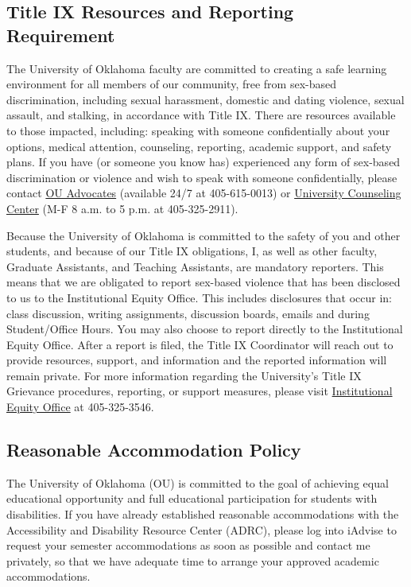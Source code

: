 \documentclass[11pt,english]{article}
\begin{document}
\subsection*{Title IX Resources and Reporting Requirement}

The University of Oklahoma faculty are committed to creating a safe learning environment for all members of our community, free from sex-based discrimination, including sexual harassment, domestic and dating violence, sexual assault, and stalking, in accordance with Title IX. There are resources available to those impacted, including: speaking with someone confidentially about your options, medical attention, counseling, reporting, academic support, and safety plans. If you have (or someone you know has) experienced any form of sex-based discrimination or violence and wish to speak with someone confidentially, please contact \href{https://www.ou.edu/advocacyandeducation/ou-advocates}{OU Advocates} (available 24/7 at 405-615-0013) or \href{http://ou.edu/ucc}{University Counseling Center} (M-F 8 a.m. to 5 p.m. at 405-325-2911).

Because the University of Oklahoma is committed to the safety of you and other students, and because of our Title IX obligations, I, as well as other faculty, Graduate Assistants, and Teaching Assistants, are mandatory reporters. This means that we are obligated to report sex-based violence that has been disclosed to us to the Institutional Equity Office. This includes disclosures that occur in: class discussion, writing assignments, discussion boards, emails and during Student/Office Hours. You may also choose to report directly to the Institutional Equity Office. After a report is filed, the Title IX Coordinator will reach out to provide resources, support, and information and the reported information will remain private. For more information regarding the University's Title IX Grievance procedures, reporting, or support measures, please visit \href{https://www.ou.edu/eoo}{Institutional Equity Office} at 405-325-3546.

\subsection*{Reasonable Accommodation Policy}

The University of Oklahoma (OU) is committed to the goal of achieving equal educational opportunity and full educational participation for students with disabilities. If you have already established reasonable accommodations with the Accessibility and Disability Resource Center (ADRC), please log into iAdvise to request your semester accommodations as soon as possible and contact me privately, so that we have adequate time to arrange your approved academic accommodations.
\end{document}
